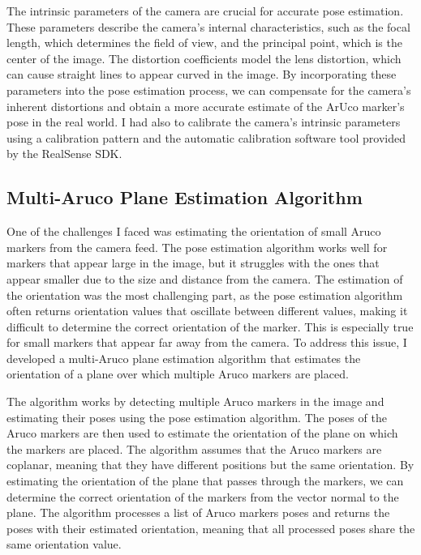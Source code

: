 The intrinsic parameters of the camera are crucial for accurate pose estimation. These parameters describe the camera's
internal characteristics, such as the focal length, which determines the field of view, and the principal point,
which is the center of the image. The distortion coefficients model the lens distortion, which can cause straight
lines to appear curved in the image. By incorporating these parameters into the pose estimation process,
we can compensate for the camera's inherent distortions and obtain a more accurate estimate of the ArUco marker's pose
in the real world. I had also to calibrate the camera's intrinsic parameters using a calibration pattern and the
automatic calibration software tool provided by the RealSense SDK.


\subsection{Multi-Aruco Plane Estimation Algorithm}

One of the challenges I faced was estimating the orientation of small Aruco markers from the camera feed.
The pose estimation algorithm works well for markers that appear large in the image, but it struggles with
the ones that appear smaller due to the size and distance from the camera. The estimation of the orientation
was the most challenging part, as the pose estimation algorithm often returns orientation values that
oscillate between different values, making it difficult to determine the correct orientation of the marker.
This is especially true for small markers that appear far away from the camera. To address this issue,
I developed a multi-Aruco plane estimation algorithm that estimates the orientation of a plane over which
multiple Aruco markers are placed.

The algorithm works by detecting multiple Aruco markers in the image and estimating their poses using the pose
estimation algorithm. The poses of the Aruco markers are then used to estimate the orientation of the plane
on which the markers are placed. The algorithm assumes that the Aruco markers are coplanar, meaning that 
they have different positions but the same orientation. By estimating the orientation of the plane that passes
through the markers, we can determine the correct orientation of the markers from the vector normal
to the plane. The algorithm processes a list of Aruco markers poses and returns the poses with their
estimated orientation, meaning that all processed poses share the same orientation value.


